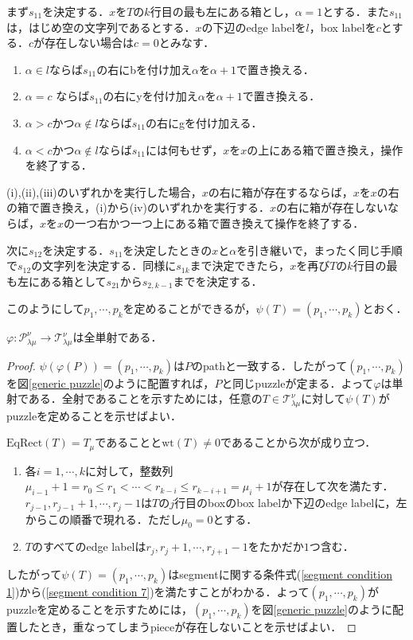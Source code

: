 まず$s_{11}$を決定する．$x$を$T$の$k$行目の最も左にある箱とし，$\alpha = 1$とする．また$s_{11}$は，はじめ空の文字列であるとする．$x$の下辺のedge labelを$l$，box labelを$c$とする．$c$が存在しない場合は$c=0$とみなす．
\begin{enumerate}
  \item $\alpha \in l$ならば$s_{11}$の右にbを付け加え$\alpha$を$\alpha+1$で置き換える．
  \item $\alpha = c$ ならば$s_{11}$の右にyを付け加え$\alpha$を$\alpha+1$で置き換える．
  \item $\alpha > c$かつ$\alpha\notin l$ならば$s_{11}$の右にgを付け加える．
  \item $\alpha < c$かつ$\alpha\notin l$ならば$s_{11}$には何もせず，$x$を$x$の上にある箱で置き換え，操作を終了する．
\end{enumerate}
(i),(ii),(iii)のいずれかを実行した場合，$x$の右に箱が存在するならば，$x$を$x$の右の箱で置き換え，(i)から(iv)のいずれかを実行する．$x$の右に箱が存在しないならば，$x$を$x$の一つ右かつ一つ上にある箱で置き換えて操作を終了する．

次に$s_{12}$を決定する．$s_{11}$を決定したときの$x$と$\alpha$を引き継いで，まったく同じ手順で$s_{12}$の文字列を決定する．同様に$s_{1k}$まで決定できたら，$x$を再び$T$の$k$行目の最も左にある箱として$s_{21}$から$s_{2,k-1}$までを決定する．

このようにして$p_1,\cdots,p_k$を定めることができるが，$\psi(T)=(p_1,\cdots,p_k)$とおく．


\begin{prop}
  $\varphi\colon\mathcal{P}^\nu_{\lambda\mu}\rightarrow\mathcal{T}^\nu_{\lambda\mu}$は全単射である．
\end{prop}

\begin{proof}
  $\psi(\varphi(P))=(p_1,\cdots,p_k)$は$P$のpathと一致する．したがって$(p_1,\cdots,p_k)$を図\ref{generic puzzle}のように配置すれば，$P$と同じpuzzleが定まる．よって$\varphi$は単射である．全射であることを示すためには，任意の$T\in\mathcal{T}^\nu_{\lambda\mu}$に対して$\psi(T)$がpuzzleを定めることを示せばよい．

  $\text{EqRect}(T)=T_\mu$であることと$\text{wt}(T)\neq 0$であることから次が成り立つ．
  \begin{enumerate}
    \item 各$i=1,\cdots,k$に対して，整数列$\mu_{i-1}+1=r_0\leq r_{1}<\cdots<r_{k-i}\leq r_{k-i+1}=\mu_i+1$が存在して次を満たす．$r_{j-1},r_{j-1}+1,\cdots,r_{j}-1$は$T$の$j$行目のboxのbox labelか下辺のedge labelに，左からこの順番で現れる．ただし$\mu_0=0$とする．
    \item $T$のすべてのedge labelは$r_{j},r_{j}+1,\cdots,r_{j+1}-1$をたかだか$1$つ含む．
  \end{enumerate}
  
  したがって$\psi(T)=(p_1,\cdots,p_k)$はsegmentに関する条件式(\ref{segment condition 1})から(\ref{segment condition 7})を満たすことがわかる．よって$(p_1,\cdots,p_k)$がpuzzleを定めることを示すためには，$(p_1,\cdots,p_k)$を図\ref{generic puzzle}のように配置したとき，重なってしまうpieceが存在しないことを示せばよい．

  
\end{proof}
